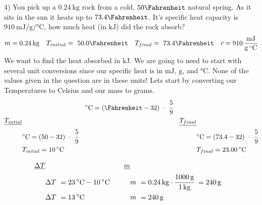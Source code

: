 \documentclass[12pt, oneside, letterpaper]{book}
\begin{document}
4) You pick up a $\qty{0.24}{\kilo\gram}$ rock from a cold, $50 \Fahrenheit$ natural spring. As it sits in the sun it heats up to $73.4 \Fahrenheit$. It's specific heat capacity is $\qty[per-mode=fraction]{910}{\milli\joule\per\gram\per \degreeCelsius}$, how much heat (in $\si{\kilo\joule}$) did the rock absorb?
\begin{align*}
m &= \qty{0.24}{\kilo\gram}  
& T_{initial}&=\ 50.0\Fahrenheit
& T_{final} &=\ 73.4\Fahrenheit 
& c = \qty[per-mode=fraction]{910}{\milli\joule\per\gram\per\degreeCelsius} 
\end{align*}
We want to find the heat absorbed in $\si{\kilo\joule}$. We are going to need to start with several unit conversions since our specific heat is in $\si{\milli\joule}$, $\si{\gram}$, and $\si{\degreeCelsius}$. None of the values given in the question are in these units! Lets start by converting our Temperatures to Celsius and our mass to grams. 
\begin{align*}
    && \si{\degreeCelsius} &= (\Fahrenheit-32)\ 
    \cdot\  \cfrac{5}{9} &&
    \\
    \underline{T_{intial}} 
    &&&& \underline{T_{final}} 
    \\
    &\si{\degreeCelsius} = (50-32)\ \cdot\ \cfrac{5}{9} 
    &&&& \si{\degreeCelsius} = (73.4-32)\ \cdot\ \cfrac{5}{9} 
    \\
    &T_{intial}= \qty{10}{\degreeCelsius} 
    &&&& T_{final}= \qty{23.00}{\degreeCelsius}
\end{align*}

\begin{align*}    
    \underline{\Delta T} 
    &&&& \underline{m}
    \\
    & \Delta T\ = \qty{23}{\degreeCelsius} - \qty{10}{\degreeCelsius} 
    &&&& m\ =\qty{0.24}{\kilo\gram} \cdot \cfrac{\qty{1000}{\gram}}{\qty{1}{\kilo\gram}}\ = \qty{240}{\gram}
    \\
    & \Delta T\ =\qty{13}{\degreeCelsius} 
    &&&& m\ = \qty{240}{\gram}    
\end{align*}
\end{document}
